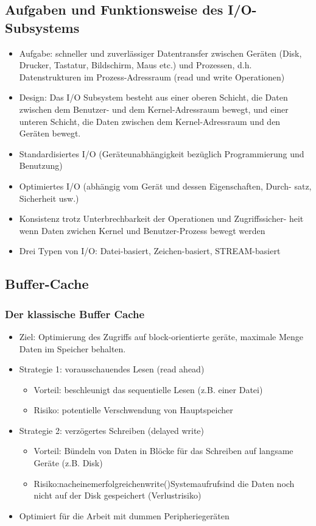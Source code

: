 \documentclass[a4paper, 10pt]{article}
\begin{document}
\subsection{Aufgaben und Funktionsweise des I/O-Subsystems}
\begin{itemize}
	\item Aufgabe: schneller und zuverlässiger Datentransfer zwischen Geräten (Disk, Drucker, Tastatur, Bildschirm, Maus etc.) und Prozessen, d.h. Datenstrukturen im Prozess-Adressraum (read und write Operationen)
	\item Design: Das I/O Subsystem besteht aus einer oberen Schicht, die Daten zwischen dem Benutzer- und dem Kernel-Adressraum bewegt, und einer unteren Schicht, die Daten zwischen dem Kernel-Adressraum und den Geräten bewegt.
	\item Standardisiertes I/O (Geräteunabhängigkeit bezüglich Programmierung und Benutzung)
	\item Optimiertes I/O (abhängig vom Gerät und dessen Eigenschaften, Durch- satz, Sicherheit usw.)
	\item Konsistenz trotz Unterbrechbarkeit der Operationen und Zugriffssicher- heit wenn Daten zwichen Kernel und Benutzer-Prozess bewegt werden
	\item Drei Typen von I/O: Datei-basiert, Zeichen-basiert, STREAM-basiert
\end{itemize}

\subsection{Buffer-Cache}
\subsubsection{Der klassische Buffer Cache}
\begin{itemize}
	\item Ziel: Optimierung des Zugriffs auf block-orientierte geräte, maximale Menge Daten im Speicher behalten.
	\item Strategie 1: vorausschauendes Lesen (read ahead)
		\begin{itemize}
			\item Vorteil: beschleunigt das sequentielle Lesen (z.B. einer Datei)
			\item Risiko: potentielle Verschwendung von Hauptspeicher
		\end{itemize}
	\item Strategie 2: verzögertes Schreiben (delayed write)
		\begin{itemize}
			\item Vorteil: Bündeln von Daten in Blöcke für das Schreiben auf langsame Geräte (z.B. Disk)
			\item Risiko:nacheinemerfolgreichenwrite()Systemaufrufsind die Daten noch nicht auf der Disk gespeichert (Verlustrisiko)
		\end{itemize}
	\item Optimiert für die Arbeit mit dummen Peripheriegeräten
\end{itemize}
\end{document}
